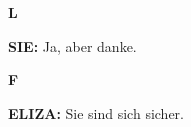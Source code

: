\documentclass{article}
\begin{document}
\vspace{0.5cm}

\begin{minipage}[t]{0.13\textwidth}
  \centering
  {\bfseries\fontsize{14.4}{14.4}\selectfont\textcolor{pastelblue}{L}}
\end{minipage}%
\begin{minipage}[t]{0.81\textwidth}
  \textbf{SIE:} Ja, aber danke.
\end{minipage}

\vspace{0.5cm}

\begin{minipage}[t]{0.13\textwidth}
  \centering
  {\bfseries\fontsize{14.4}{14.4}\selectfont\textcolor{pastelblue}{F}}
\end{minipage}%
\begin{minipage}[t]{0.81\textwidth}
  \textbf{ELIZA:} Sie sind sich sicher.
\end{minipage}

\vspace{0.5cm}
\end{document}
